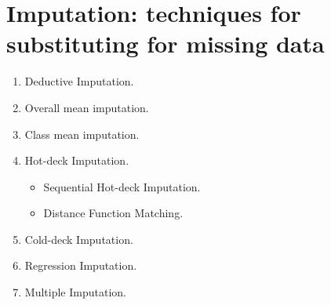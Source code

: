 

\section{Imputation: techniques for substituting for missing data}
\setcounter{theorem}{0}
\setcounter{equation}{0}


\renewcommand{\theenumi}{\roman{enumi}}
\renewcommand{\labelenumi}{\textnormal{(\theenumi)}$\;\;$}


\begin{enumerate}
\item  Deductive Imputation.
\item  Overall mean imputation.
\item  Class mean imputation.
\item  Hot-deck Imputation.
          \begin{itemize}
          \item  Sequential Hot-deck Imputation.
          \item  Distance Function Matching.
          \end{itemize}
\item  Cold-deck Imputation.
\item  Regression Imputation.
\item  Multiple Imputation.
\end{enumerate}


\renewcommand{\theenumi}{\roman{enumi}}
\renewcommand{\labelenumi}{\textnormal{(\theenumi)}$\;\;$}

